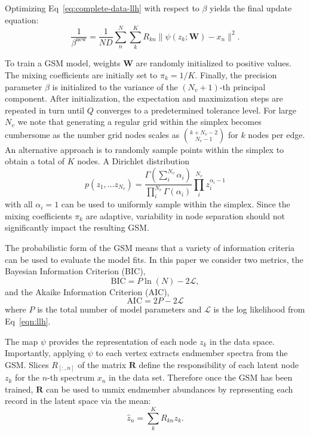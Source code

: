 \documentclass[remotesensing,article,submit,pdftex,moreauthors]{Definitions/mdpi}
\begin{document}
Optimizing Eq~\ref{eq:complete-data-llh} with respect to $\beta$ yields the final update equation:
\begin{equation}\label{eq:beta-update}
    \frac{1}{\beta^{\text{new}}}  = \frac{1}{ND}\sum\limits_n^N\sum\limits_k^K R_{kn}\lVert \psi(z_k; \mathbf{W}) - x_n \rVert^2.
\end{equation}

To train a GSM model, weights $\mathbf{W}$ are randomly initialized to positive values. The mixing coefficients are initially set to $\pi_k = 1/K$. Finally, the precision parameter $\beta$ is initialized to the variance of the $(N_v+1)$-th principal component. After initialization, the expectation and maximization steps are repeated in turn until $Q$ converges to a predetermined tolerance level. For large $N_v$ we note that generating a regular grid within the simplex becomes cumbersome as the number grid nodes scales as ${k + N_v - 2 \choose N_v - 1}$ for $k$ nodes per edge. An alternative approach is to randomly sample points within the simplex to obtain a total of $K$ nodes. A Dirichlet distribution 
\begin{equation}
    p(z_1,...z_{N_v}) = \frac{\Gamma(\sum_i^{N_v}\alpha_i)}{\prod_{i}^{N_v}\Gamma(\alpha_i)} \prod_{i}^{N_v} z_i^{\alpha_i-1}
\end{equation}
with all $\alpha_i=1$ can be used to uniformly sample within the simplex. Since the mixing coefficients $\pi_k$ are adaptive, variability in node separation should not significantly impact the resulting GSM.

The probabilistic form of the GSM means that a variety of information criteria can be used to evaluate the model fits. In this paper we consider two metrics, the Bayesian Information Criterion (BIC),
\begin{equation}
   \text{BIC} = P\ln(N) - 2\mathcal{L},
\end{equation}
and the Akaike Information Criterion (AIC),
\begin{equation}
    \text{AIC} = 2P - 2\mathcal{L}
\end{equation}
where $P$ is the total number of model parameters and $\mathcal{L}$ is the log likelihood from Eq~\ref{eqn:llh}.

The map $\psi$ provides the representation of each node $z_k$ in the data space. Importantly, applying $\psi$ to each vertex extracts endmember spectra from the GSM. Slices $R_{\left[:,n\right]}$ of the matrix $\mathbf{R}$ define the responsibility of each latent node $z_k$ for the $n$-th spectrum $x_n$ in the data set. Therefore once the GSM has been trained, $\mathbf{R}$ can be used to unmix endmember abundances by representing each record in the latent space via the mean: 
\begin{equation}
    \hat{z}_n = \sum_k^K R_{kn}z_k.
\end{equation}
\end{document}

